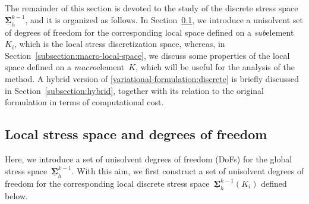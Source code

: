 \documentclass[a4paper,twoside,10pt]{article}
\theoremstyle{plain}
\theoremstyle{remark}
\theoremstyle{definition}
\numberwithin{equation}{section}
\numberwithin{figure}{section}
\newcommand{\K}{K}
\newcommand{\Sigmah}{\underline{\boldsymbol{\Sigma}}_h}
\newcommand{\Sigmahkmo}{\Sigmah^{k-1}}
\newcommand{\Ki}{{\K_i}}
\begin{document}
The remainder of this section is devoted to the study of the discrete stress space~$\Sigmahkmo$,
and it is organized as follows.
In Section~\ref{subsection:dofs},
we introduce a unisolvent set of degrees of freedom for the corresponding local space
defined on a \emph{sub}element~$\Ki$,
which is the local stress discretization space,
whereas,
in Section~\ref{subsection:macro-local-space},
we discuss some properties of
the local space defined on a \emph{macro}element~$\K$,
which will be useful for the analysis of the method.
A hybrid version of
\eqref{variational-formulation:discrete}
is briefly discussed in Section~\ref{subsection:hybrid},
together with its relation to the original formulation
in terms of computational cost.


\subsection{Local stress space and degrees of freedom} \label{subsection:dofs}
Here,
we introduce a set of unisolvent degrees of freedom (DoFs)
for the global stress space~$\Sigmahkmo$.
With this aim,
we first construct a set of unisolvent degrees of freedom
for the corresponding local discrete stress space~$\Sigmahkmo(\Ki)$
defined below.
\end{document}
